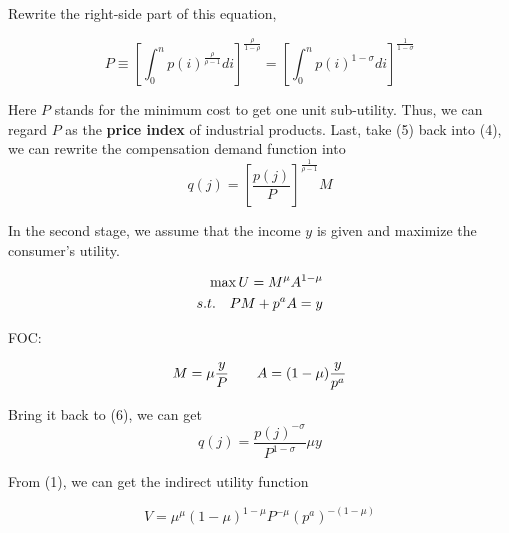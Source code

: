 \documentclass{article}
\begin{document}
Rewrite the right-side part of this equation, 

\begin{equation}
    P \equiv [\int_0^n p(i)^{\frac{\rho}{\rho -1}}di]^{\frac{\rho}{1-\rho}} = 
    [\int_0^n p(i)^{1-\sigma}di]^{\frac{1}{1-\sigma}}
\end{equation}

Here $P$ stands for the minimum cost to get one unit sub-utility. Thus, we can regard $P$ as the \textbf{price index} of industrial products. Last, take (5) back into (4), we can rewrite the compensation demand function into 
\begin{equation}
    q(j) = [\frac{p(j)}{P}]^{\frac{1}{\rho -1}}M
\end{equation}

In the second stage, we assume that the income $y$ is given and maximize the consumer's utility.

\begin{equation}
    \notag
    \begin{aligned}
     \max U = M^{\mu} A ^{1-\mu}\\
    s. t. \quad PM+p^aA = y
    \end{aligned}
\end{equation}

FOC:

\begin{equation}
    \notag
    M=\mu \frac{y}{P} \qquad A = (1-\mu ) \frac{y}{p^a}
\end{equation}

Bring it back to (6), we can get 
\begin{equation}
    q(j)= \frac{p(j)^{-\sigma}}{P^{1-\sigma}}\mu y
\end{equation}

From (1), we can get the indirect utility function 

\begin{equation}
    V= \mu^{\mu} (1- \mu)^{1-\mu} P^{-\mu} (p^a)^{-(1-\mu)}
\end{equation}
\end{document}
